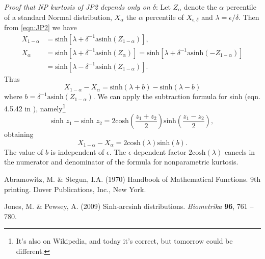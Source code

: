 \documentclass[12pt]{article}
\newcommand{\be}{\begin{equation}}
\newcommand{\ee}{\end{equation}}
\begin{document}
\begin{spacing}{1.35}
	\emph{Proof that NP kurtosis of JP2 depends only on $\delta$}: 
	Let $Z_\alpha$ denote the $\alpha$ percentile of a standard
	Normal distribution, $X_\alpha$ the $\alpha$ percentile of $X_{\epsilon, \delta}$ and 
	$\lambda =  \epsilon/\delta$. Then from \eqref{eqn:JP2}
	we have 
	\be
	\begin{aligned}
		X_{1-\alpha} & = \mbox{sinh} \left[ \lambda  + \delta^{-1} \mbox{asinh}(Z_{1-\alpha}) \right] ,  \\
		X_{\alpha} & = \mbox{sinh} \left[ \lambda  + \delta^{-1} \mbox{asinh}(Z_{\alpha}) \right]
		= \mbox{sinh} \left[ \lambda + \delta^{-1} \mbox{asinh}(-Z_{1-\alpha}) \right] \\
		& = \mbox{sinh} \left[ \lambda - \delta^{-1} \mbox{asinh}(Z_{1-\alpha}) \right]. 
	\end{aligned}
	\ee
	Thus  
	\be
	X_{1-\alpha} - X_{\alpha} = \mbox{sinh}(\lambda + b) - \mbox{sinh}(\lambda - b)
	\ee
	where $b = \delta^{-1}\mbox{asinh}(Z_{1-\alpha})$. We can apply the subtraction formula for sinh (eqn. 4.5.42
	in \citet{abram-steg}), namely\footnote{It's also on Wikipedia, and today it's correct, but tomorrow could
		be different.}
	\be 
	\mbox{sinh } z_1 - \mbox{sinh } z_2  = 2 \mbox{cosh}\left( \frac{z_1 + z_2}{2}\right) \mbox{sinh}\left( \frac{z_1 - z_2}{2}\right), 
	\ee  
	obtaining 
	\be
	X_{1-\alpha} - X_{\alpha} =  2 \mbox{cosh}(\lambda) \mbox{sinh}(b).
	\ee  
	The value of $b$ is independent of $\epsilon$. The $\epsilon$-dependent factor $2 \mbox{cosh}(\lambda)$ 
	cancels in the numerator and denominator of the formula for nonparametric kurtosis. \scalebox{1.25}{$\square$}
	\clearpage
	\newpage 
	
	\begin{thebibliography}{62}
		\providecommand{\natexlab}[1]{#1}
		
		Abramowitz, M. \& Stegun, I.A. (1970) {Handbook of Mathematical Functions. 9th printing.}
		{D}over Publications, Inc., New York.
		
		Jones, M. \& Pewsey, A. (2009) Sinh-arcsinh distributions. \emph{Biometrika}
		\textbf{96}, 761 -- 780.
		
	\end{thebibliography}

\end{spacing} 
\end{document}
